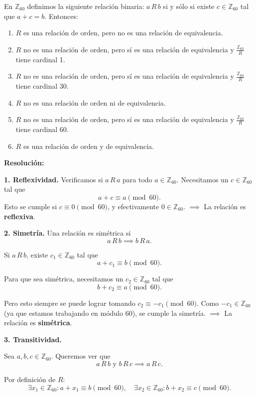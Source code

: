 \documentclass[a4paper,12pt]{article}
\begin{document}
\begin{ejercicioExamen}[title=Ejercicio 2]

En \(\mathbb{Z}_{60}\) definimos la siguiente relación binaria: 
\( a\, R\, b \) si y sólo si existe \( c \in \mathbb{Z}_{60} \) tal que \( a + c = b \).
Entonces:

\begin{enumerate}
\item[$a)$] \( R \) es una relación de orden, pero no es una relación de equivalencia. 
\item[$b)$] \( R \) no es una relación de orden, pero sí es una relación de equivalencia y \( \frac{\mathbb{Z}_{60}}{R} \) tiene cardinal 1.
\item[$c)$] \( R \) no es una relación de orden, pero sí es una relación de equivalencia y \( \frac{\mathbb{Z}_{60}}{R} \) tiene cardinal 30.
\item[$d)$] \( R \) no es una relación de orden ni de equivalencia.
\item[$e)$] \( R \) no es una relación de orden, pero sí es una relación de equivalencia y \( \frac{\mathbb{Z}_{60}}{R} \) tiene cardinal 60.
\item[$f)$] \( R \) es una relación de orden y de equivalencia.
\end{enumerate}

\tcblower
\textbf{Resolución:}

\medskip
\textbf{1. Reflexividad.}  
Verificamos si \(a \, R \, a\) para todo \(a \in \mathbb{Z}_{60}\).  
Necesitamos un \(c \in \mathbb{Z}_{60}\) tal que
\[
a + c \equiv a \pmod{60}.
\]  
Esto se cumple si \(c \equiv 0 \pmod{60}\), y efectivamente \(0 \in \mathbb{Z}_{60}\).  
\(\implies\) La relación es \textbf{reflexiva}.

\medskip
\textbf{2. Simetría.}  
Una relación es simétrica si
\[
a \, R \, b \implies b \, R \, a.
\]

Si \(a \, R \, b\), existe \(c_1 \in \mathbb{Z}_{60}\) tal que
\[
a + c_1 \equiv b \pmod{60}.
\]

Para que sea simétrica, necesitamos un \(c_2 \in \mathbb{Z}_{60}\) tal que
\[
b + c_2 \equiv a \pmod{60}.
\]

Pero esto siempre se puede lograr tomando \(c_2 \equiv -c_1 \pmod{60}\).  
Como \(-c_1 \in \mathbb{Z}_{60}\) (ya que estamos trabajando en módulo 60), se cumple la simetría.  
\(\implies\) La relación es \textbf{simétrica}.

\medskip

\textbf{3. Transitividad.}  

Sea \(a, b, c \in \mathbb{Z}_{60}\). Queremos ver que
\[
a \, R \, b \text{ y } b \, R \, c \implies a \, R \, c.
\]

Por definición de \(R\):
\[
\exists x_1 \in \mathbb{Z}_{60} : a + x_1 \equiv b \pmod{60}, \quad
\exists x_2 \in \mathbb{Z}_{60} : b + x_2 \equiv c \pmod{60}.
\]

\end{ejercicioExamen}
\end{document}
